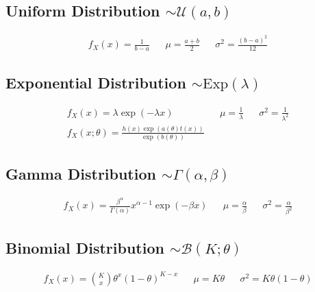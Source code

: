 \begin{mdframed}[style=eqbox]
  \subsection{Uniform Distribution $\sim \mathcal{U}(a,b)$}
  \vspace*{-6pt}
  \begin{align*}
    f_X(x) = \frac{1}{b-a} && \mu = \frac{a+b}{2} && \sigma^2 = \frac{(b-a)^2}{12}
  \end{align*}
\end{mdframed}
\begin{mdframed}[style=eqbox]
  \subsection{Exponential Distribution $\sim \text{Exp}(\lambda)$}
  \vspace*{-6pt}
  \begin{align*}
    f_X(x) = \lambda \exp(-\lambda x) && \mu = \frac{1}{\lambda} && \sigma^2 = \frac{1}{\lambda^2}\\
    f_X(x; \theta) = \frac{h(x)\exp(a(\theta)t(x))}{\exp(b(\theta))}
  \end{align*}
\end{mdframed}
\begin{mdframed}[style=eqbox]
  \subsection{Gamma Distribution $\sim \Gamma(\alpha, \beta)$}
  \vspace*{-6pt}
  \begin{align*}
    f_X(x) = \frac{\beta^\alpha}{\Gamma(\alpha)} x^{\alpha-1} \exp(-\beta x) && \mu = \frac{\alpha}{\beta} && \sigma^2 = \frac{\alpha}{\beta^2}
  \end{align*}
\end{mdframed}
\newpage
\begin{mdframed}[style=eqbox]
  \subsection{Binomial Distribution $\sim \mathcal{B}(K;\theta)$}
  \vspace*{-6pt}
  \begin{align*}
    f_X(x) = \binom{K}{x} \theta^x (1-\theta)^{K-x} && \mu = K \theta && \sigma^2 = K \theta (1-\theta)
  \end{align*}
\end{mdframed}